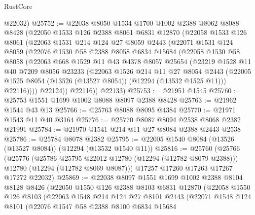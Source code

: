 \begin{lexlean}{RustCore}
\begin{coremodule}
      @22032)
@25752 := @22038
    @8050
    @1534
    @1700
    @1002
    @2388
    @8062
    @8088
    @8428
    (@22050
      @1533
      @126
      @2388
      @8061
      @6831
      @12870
      (@22058
        @1533
        @126
        @8061
        (@22063
          @1531
          @214
          @124
          @27
          @8059
          @2443
          (@22071
            @1531
            @124
            @8059
            (@22076
              @1530
              @58
              @2388
              @8058
              @6834
              @15684
              (@22058
                @1530
                @58
                @8058
                (@22063
                  @668
                  @1529
                  @11
                  @43
                  @4378
                  @8057
                  @25654
                  (@23219
                    @1528
                    @11
                    @40
                    @7209
                    @8056
                    @23233
                    (@22063
                      @1526
                      @214
                      @11
                      @27
                      @8054
                      @2443
                      (@22005 @1525 @8054 (@13526 (@13527 @8054)) (@12294 (@13532 @1525 @11)))
                      @22116))))
              @22124))
          @22116))
      @22133)
@25753 := @21951 @1545
@25760 := @25753 @1551 @1699 @1002 @8088 @8097 @2388 @8428
@25763 := @21962 @1544 @43 @13
@25766 := @25763 @8088 @8095 @4384
@25770 := @21971 @1543 @11 @40 @3164
@25776 := @25770 @8087 @8094 @2538 @8068 @2382 @21991
@25784 := @21970 @1541 @214 @11 @27 @8084 @2388 @2443 @2538
@25786 := @25784 @8078 @2382
@25795 := @22005 @1540 @8084 (@13526 (@13527 @8084)) (@12294 (@13532 @1540 @11))
@25816 := @25760
    (@25766
      (@25776
        (@25786 @25795 @22012 @12780 (@12294 (@12782 @8079 @2388)))
        @12780
        (@12294 (@12782 @8069 @8087)))
      @17257
      @17260
      @17263
      @17267
      @17272
      @22032)
@25869 := @22038
    @8097
    @1551
    @1699
    @1002
    @2388
    @8104
    @8128
    @8426
    (@22050
      @1550
      @126
      @2388
      @8103
      @6831
      @12870
      (@22058
        @1550
        @126
        @8103
        (@22063
          @1548
          @214
          @124
          @27
          @8101
          @2443
          (@22071
            @1548
            @124
            @8101
            (@22076
              @1547
              @58
              @2388
              @8100
              @6834
              @15684

\end{coremodule}
\end{lexlean}
